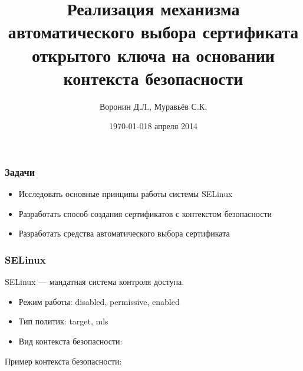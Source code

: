 \documentclass[xcolor={dvipsnames,table}]{beamer}
\date{\today}
\title[]{Реализация механизма автоматического выбора сертификата открытого ключа на основании контекста безопасности}
\date{8 апреля 2014}
\author{Воронин Д.Л., Муравьёв С.К.}
\begin{document}
\frame{\titlepage}




\begin{frame}
 \frametitle{Задачи}
  


\begin{itemize}
  \item Исследовать основные принципы работы системы SELinux
  \item Разработать способ создания сертификатов с контекстом безопасности
  \item Разработать средства автоматического выбора сертификата
\end{itemize}

  
\end{frame}
\begin{frame}
 \frametitle{SELinux}
  


SELinux --- мандатная система контроля доступа.

\vspace{ 1em }

\begin{itemize}
  \item Режим работы: disabled, permissive, enabled
  \item Тип политик: target, mls
  \item Вид контекста безопасности:

\oeoecjnhimgdibjgdhicjejomppjljle

\end{itemize}


\vspace{ 1em }

Пример контекста безопасности:

\hphcedkmnkififhjegdolhelnmpkoaah



  
\end{frame}
\end{document}
